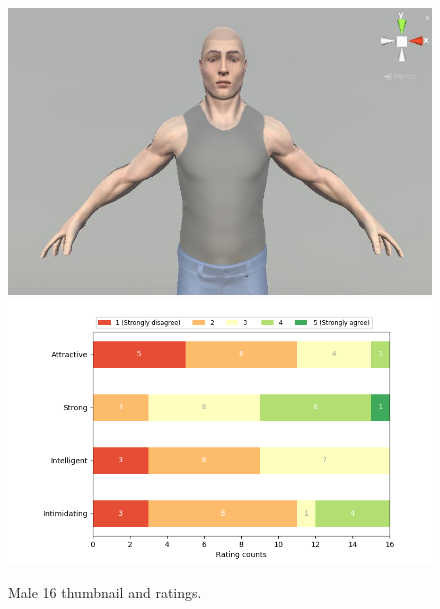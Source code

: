 \begin{figure}[H]
  \includegraphics[width=\linewidth]{Images/Males/16.JPG}
\endminipage\hfill
{}
  \includegraphics[width=\linewidth]{Survey/MRatings/avatar_m16.png}
\endminipage\hfill
\caption{Male 16 thumbnail and ratings.}
\end{figure}

